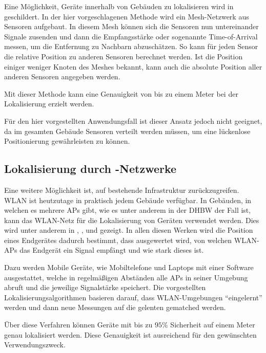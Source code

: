 Eine Möglichkeit, Geräte innerhalb von Gebäuden zu lokalisieren wird in \cite{Patwari2003}
geschildert. In der hier vorgeschlagenen Methode wird ein \gls{Mesh-Netzwerk} aus Sensoren aufgebaut.
In diesem Mesh können sich die Sensoren nun untereinander Signale zusenden und dann die
Empfangsstärke oder sogenannte Time-of-Arrival messen, um die Entfernung zu Nachbarn abzuschätzen.
So kann für jeden Sensor die relative Position zu anderen Sensoren berechnet werden.
Ist die Position einiger weniger Knoten des Meshes bekannt, kann auch die absolute Position aller
anderen Sensoren angegeben werden.

Mit dieser Methode kann eine Genauigkeit von bis zu einem Meter bei der Lokalisierung erzielt
werden.

Für den hier vorgestellten Anwendungsfall ist dieser Ansatz jedoch nicht geeignet, da im gesamten
Gebäude Sensoren verteilt werden müssen, um eine lückenlose Positionierung gewährleisten zu können.

\subsection{Lokalisierung durch -Netzwerke}

Eine weitere Möglichkeit ist, auf bestehende Infrastruktur zurückzugreifen. \Gls{WLAN} ist
heutzutage in praktisch jedem Gebäude verfügbar.
In Gebäuden, in welchen es mehrere \glspl{AP} gibt, wie es unter anderem in der \gls{DHBW} der Fall
ist, kann das \gls{WLAN}-Netz für die Lokalisierung von Geräten verwendet werden. Dies wird unter
anderem in \cite{Xiang2004}, \cite{Dong2009}, \cite{Paschalidis2009} und \cite{Liang2009} gezeigt.
In allen diesen Werken wird die Position eines Endgerätes dadurch bestimmt, dass ausgewertet wird,
von welchen \gls{WLAN}-\glspl{AP} das Endgerät ein Signal empfängt und wie stark dieses ist.

Dazu werden Mobile Geräte, wie Mobiltelefone und Laptops mit einer Software ausgestattet, welche in
regelmäßigen Abständen alle \glspl{AP} in seiner Umgebung abruft und die jeweilige Signalstärke
speichert. Die vorgestellten Lokalisierungsalgorithmen basieren darauf, dass \gls{WLAN}-Umgebungen
\enquote{eingelernt} werden und dann neue Messungen auf die gelenten gematched werden.

Über diese Verfahren können Geräte mit bis zu $95\%$ Sicherheit auf einem Meter genau lokalisiert
werden. Diese Genauigkeit ist ausreichend für den gewünschten Verwendungszweck.
